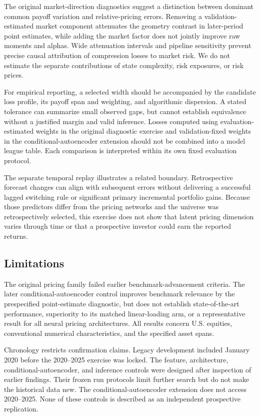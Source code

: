 The original market-direction diagnostics suggest a distinction between dominant common payoff variation and relative-pricing errors. Removing a validation-estimated market component attenuates the geometry contrast in later-period point estimates, while adding the market factor does not jointly improve raw moments and alphas. Wide attenuation intervals and pipeline sensitivity prevent precise causal attribution of compression losses to market risk. We do not estimate the separate contributions of state complexity, risk exposures, or risk prices.

For empirical reporting, a selected width should be accompanied by the candidate loss profile, its payoff span and weighting, and algorithmic dispersion. A stated tolerance can summarize small observed gaps, but cannot establish equivalence without a justified margin and valid inference. Losses computed using evaluation-estimated weights in the original diagnostic exercise and validation-fixed weights in the conditional-autoencoder extension should not be combined into a model league table. Each comparison is interpreted within its own fixed evaluation protocol.

The separate temporal replay illustrates a related boundary. Retrospective forecast changes can align with subsequent errors without delivering a successful lagged switching rule or significant primary incremental portfolio gains. Because those predictors differ from the pricing networks and the universe was retrospectively selected, this exercise does not show that latent pricing dimension varies through time or that a prospective investor could earn the reported returns.

\subsection{Limitations}

The original pricing family failed earlier benchmark-advancement criteria. The later conditional-autoencoder control improves benchmark relevance by the prespecified point-estimate diagnostic, but does not establish state-of-the-art performance, superiority to its matched linear-loading arm, or a representative result for all neural pricing architectures. All results concern U.S. equities, conventional numerical characteristics, and the specified asset spans.

Chronology restricts confirmation claims. Legacy development included January 2020 before the 2020--2025 exercise was locked. The feature, architecture, conditional-autoencoder, and inference controls were designed after inspection of earlier findings. Their frozen run protocols limit further search but do not make the historical data new. The conditional-autoencoder extension does not access 2020--2025. None of these controls is described as an independent prospective replication.

